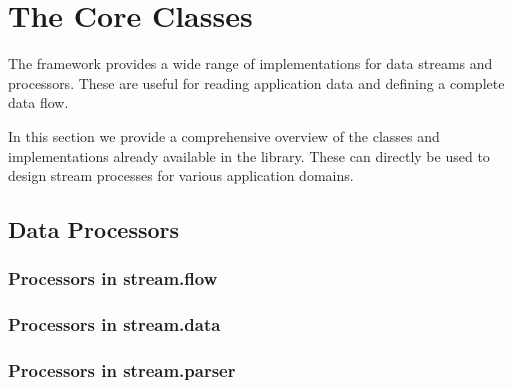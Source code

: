 \section{The \streams Core Classes}
The \streams framework provides a wide range of implementations for
data streams and processors. These are useful for reading application
data and defining a complete data flow.

In this section we provide a comprehensive overview of the classes and
implementations already available in the \streams library. These can
directly be used to design stream processes for various application
domains.



\subsection{Data Processors}

\subsubsection{Processors in {\ttfamily stream.flow}}

%

\subsubsection{Processors in {\ttfamily stream.data}}

\subsubsection{Processors in {\ttfamily stream.parser}}
